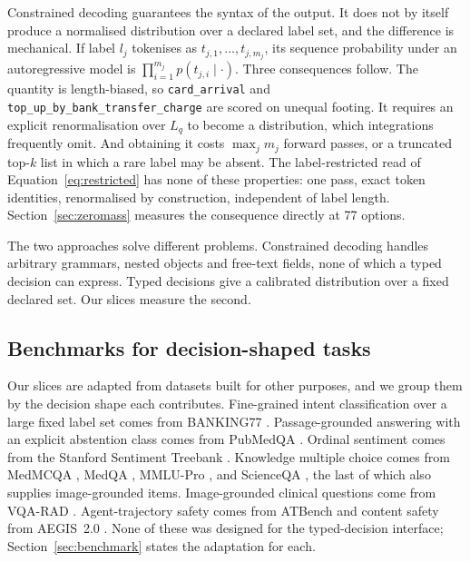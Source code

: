 Constrained decoding guarantees the syntax of the output. It does not by itself
produce a normalised distribution over a declared label set, and the difference is
mechanical. If label $l_j$ tokenises as $t_{j,1},\dots,t_{j,m_j}$, its sequence
probability under an autoregressive model is $\prod_{i=1}^{m_j} p(t_{j,i} \mid
\cdot)$. Three consequences follow. The quantity is length-biased, so
\texttt{card\_arrival} and \texttt{top\_up\_by\_bank\_transfer\_charge} are scored
on unequal footing. It requires an explicit renormalisation over $L_q$ to become a
distribution, which integrations frequently omit. And obtaining it costs
$\max_j m_j$ forward passes, or a truncated top-$k$ list in which a rare label may
be absent. The label-restricted read of Equation~\eqref{eq:restricted} has none of
these properties: one pass, exact token identities, renormalised by construction,
independent of label length. Section~\ref{sec:zeromass} measures the consequence
directly at 77 options.

The two approaches solve different problems. Constrained decoding handles
arbitrary grammars, nested objects and free-text fields, none of which a typed
decision can express. Typed decisions give a calibrated distribution over a fixed
declared set. Our slices measure the second.

\subsection{Benchmarks for decision-shaped tasks}

Our slices are adapted from datasets built for other purposes, and we group them
by the decision shape each contributes. Fine-grained intent classification over a
large fixed label set comes from BANKING77 \citep{casanueva2020banking77}.
Passage-grounded answering with an explicit abstention class comes from PubMedQA
\citep{jin2019pubmedqa}. Ordinal sentiment comes from the Stanford Sentiment
Treebank \citep{socher2013sst}. Knowledge multiple choice comes from MedMCQA
\citep{pal2022medmcqa}, MedQA \citep{jin2020disease}, MMLU-Pro
\citep{wang2024mmlupro}, and ScienceQA \citep{lu2022scienceqa}, the last of which
also supplies image-grounded items. Image-grounded clinical questions come from
VQA-RAD \citep{lau2018vqarad}. Agent-trajectory safety comes from ATBench
\citep{li2026atbench} and content safety from AEGIS~2.0
\citep{ghosh2025aegis2}. None of these was designed for the typed-decision
interface; Section~\ref{sec:benchmark} states the adaptation for each.

